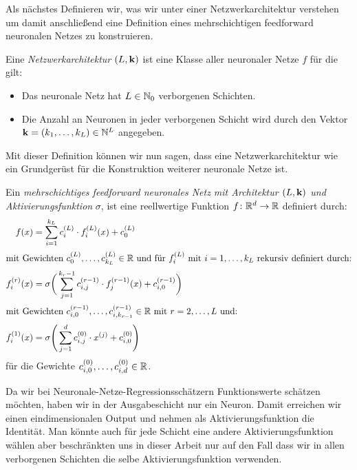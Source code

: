 Als nächstes Definieren wir, was wir unter einer Netzwerkarchitektur verstehen um damit anschließend eine Definition eines mehrschichtigen feedforward neuronalen Netzes zu konstruieren.
\begin{defn}
Eine \emph{Netzwerkarchitektur $(L, \mathbf{k})$} ist eine Klasse aller neuronaler Netze $f$ für die gilt:
\begin{itemize}
\item Das neuronale Netz hat $L \in \mathbb{N}_0$ verborgenen Schichten.
\item Die Anzahl an Neuronen in jeder verborgenen Schicht wird durch den Vektor $\mathbf{k} = (k_1,\dots,k_L) \in \mathbb{N}^L$ angegeben.
\end{itemize}
Mit dieser Definition können wir nun sagen, dass eine Netzwerkarchitektur wie ein Grundgerüst für die Konstruktion weiterer neuronale Netze ist.
\end{defn}
\begin{defn}
\label{def:nn}
Ein \emph{mehrschichtiges feedforward neuronales Netz mit Architektur $(L, \mathbf{k})$ und Aktivierungsfunktion} $\sigma$, ist eine reellwertige Funktion $f\colon \mathbb{R}^d \to \mathbb{R}$ definiert durch:
\begin{align}
\label{networkarch}
f(x) & = \sum_{i = 1}^{k_L} c_i^{(L)} \cdot f_i^{(L)}(x) + c_0^{(L)} \nonumber \\
\intertext{mit Gewichten $c_0^{(L)},\dots,c_{k_L}^{(L)} \in \mathbb{R}$ und für $f_i^{(L)}$ mit $i = 1,\dots,k_L$ rekursiv definiert durch:} 
f_i^{(r)}(x) & = \sigma \bigg(\sum_{j = 1}^{k_r - 1} c_{i,j}^{(r - 1)} \cdot f_j^{(r - 1)}(x) + c_{i,0}^{(r - 1)} \bigg)\\
\intertext{mit Gewichten $c_{i,0}^{(r - 1)},\dots,c_{i,k_{r - 1}}^{(r - 1)} \in \mathbb{R}$ mit $r = 2,\dots, L$ und:}
f_i^{(1)}(x) & = \sigma \Bigg(\sum_{j = 1}^{d} c_{i,j}^{(0)} \cdot x^{(j)} + c_{i,0}^{(0)} \Bigg) \nonumber
\end{align} 
für die Gewichte $c_{i,0}^{(0)},\dots,c_{i,d}^{(0)} \in \mathbb{R}$.
\end{defn}
Da wir bei Neuronale-Netze-Regressionsschätzern Funktionswerte schätzen möchten, haben wir in der Ausgabeschicht nur ein Neuron. Damit erreichen wir einen eindimensionalen Output und nehmen als Aktivierungsfunktion die Identität.
Man könnte auch für jede Schicht eine andere Aktivierungsfunktion wählen aber beschränkten uns in dieser Arbeit nur auf den Fall dass wir in allen verborgenen Schichten die selbe Aktivierungsfunktion verwenden.

